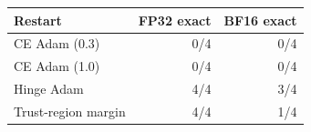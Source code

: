 \begin{tabular}{lrr}
\toprule
Restart & FP32 exact & BF16 exact \\
\midrule
CE Adam (0.3) & 0/4 & 0/4 \\
CE Adam (1.0) & 0/4 & 0/4 \\
Hinge Adam & 4/4 & 3/4 \\
Trust-region margin & 4/4 & 1/4 \\
\bottomrule
\end{tabular}
